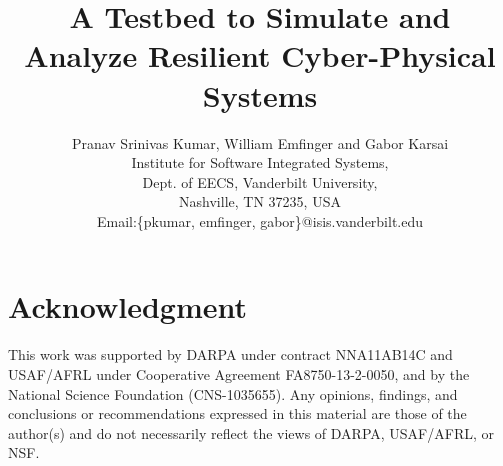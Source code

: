 \documentclass[conference]{IEEEtran}
\begin{document}
%
\title{A Testbed to Simulate and Analyze Resilient Cyber-Physical Systems}


\author{ Pranav Srinivas Kumar, William Emfinger and Gabor Karsai \\
Institute for Software Integrated Systems,\\ Dept. of EECS, Vanderbilt University,\\
Nashville, TN 37235, USA \\
Email:\{pkumar, emfinger, gabor\}@isis.vanderbilt.edu}


\maketitle








\section*{Acknowledgment}
This work was supported by DARPA under contract NNA11AB14C and USAF/AFRL under Cooperative Agreement FA8750-13-2-0050, and by the National Science Foundation (CNS-1035655). Any opinions, findings, and conclusions or recommendations expressed in this material are those of the author(s) and do not necessarily reflect the views of DARPA, USAF/AFRL, or NSF.



\end{document}
